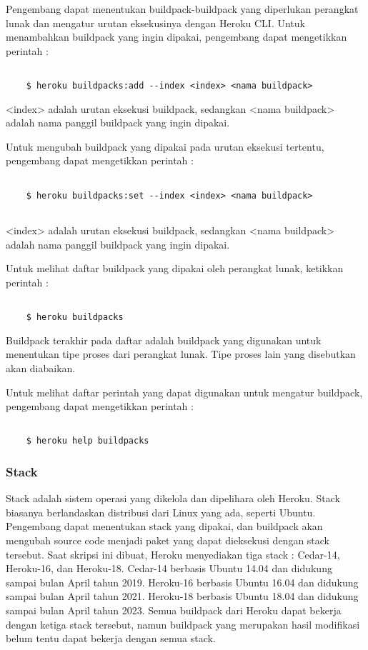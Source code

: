 Pengembang dapat menentukan buildpack-buildpack yang diperlukan perangkat lunak dan mengatur urutan eksekusinya dengan Heroku CLI. Untuk menambahkan buildpack yang ingin dipakai, pengembang dapat mengetikkan perintah :
\begin{lstlisting}

	$ heroku buildpacks:add --index <index> <nama buildpack>

\end{lstlisting}
<index> adalah urutan eksekusi buildpack, sedangkan <nama buildpack> adalah nama panggil buildpack yang ingin dipakai.

Untuk mengubah buildpack yang dipakai pada urutan eksekusi tertentu, pengembang dapat mengetikkan perintah :
\begin{lstlisting}

	$ heroku buildpacks:set --index <index> <nama buildpack>
	
\end{lstlisting}
<index> adalah urutan eksekusi buildpack, sedangkan <nama buildpack> adalah nama panggil buildpack yang ingin dipakai.

Untuk melihat daftar buildpack yang dipakai oleh perangkat lunak, ketikkan perintah :
\begin{lstlisting}

	$ heroku buildpacks

\end{lstlisting}
Buildpack terakhir pada daftar adalah buildpack yang digunakan untuk menentukan tipe proses dari perangkat lunak. Tipe proses lain yang disebutkan akan diabaikan.

Untuk melihat daftar perintah yang dapat digunakan untuk mengatur buildpack, pengembang dapat mengetikkan perintah :
\begin{lstlisting}

	$ heroku help buildpacks

\end{lstlisting}

\subsubsection{Stack}
Stack adalah sistem operasi yang dikelola dan dipelihara oleh Heroku. Stack biasanya berlandaskan distribusi dari Linux yang ada, seperti Ubuntu. Pengembang dapat menentukan stack yang dipakai, dan buildpack akan mengubah source code menjadi paket yang dapat dieksekusi dengan stack tersebut. Saat skripsi ini dibuat, Heroku menyediakan tiga stack : Cedar-14, Heroku-16, dan Heroku-18. Cedar-14 berbasis Ubuntu 14.04 dan didukung sampai bulan April tahun 2019. Heroku-16 berbasis Ubuntu 16.04 dan didukung sampai bulan April tahun 2021. Heroku-18 berbasis Ubuntu 18.04 dan didukung sampai bulan April tahun 2023. Semua buildpack dari Heroku dapat bekerja dengan ketiga stack tersebut, namun buildpack yang merupakan hasil modifikasi belum tentu dapat bekerja dengan semua stack.

